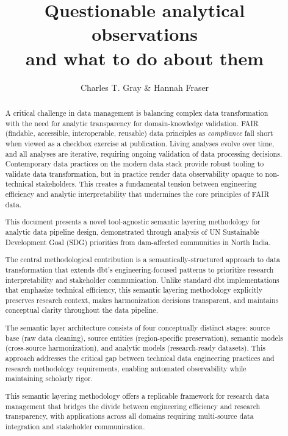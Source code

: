 \documentclass{article}
\title{Questionable analytical observations\\and what to do about them}
\author{Charles T. Gray \& Hannah Fraser}
\begin{document}
\maketitle



\begin{abstract}

A critical challenge in data management is balancing complex data transformation with the need for analytic transparency for domain-knowledge validation. FAIR (findable, accessible, interoperable, reusable) data principles as \textit{compliance} fall short when viewed as a checkbox exercise at publication. Living analyses evolve over time, and all analyses are iterative, requiring ongoing validation of data processing decisions. Contemporary data practices on the modern data stack provide robust tooling to validate data transformation, but in practice render data observability opaque to non-technical stakeholders. This creates a fundamental tension between engineering efficiency and analytic interpretability that undermines the core principles of FAIR data.

This document presents a novel tool-agnostic semantic layering methodology for analytic data pipeline design, demonstrated through analysis of UN Sustainable Development Goal (SDG) priorities from dam-affected communities in North India.

The central methodological contribution is a semantically-structured approach to data transformation that extends dbt's engineering-focused patterns to prioritize research interpretability and stakeholder communication. Unlike standard dbt implementations that emphasize technical efficiency, this semantic layering methodology explicitly preserves research context, makes harmonization decisions transparent, and maintains conceptual clarity throughout the data pipeline.

The semantic layer architecture consists of four conceptually distinct stages: source base (raw data cleaning), source entities (region-specific preservation), semantic models (cross-source harmonization), and analytic models (research-ready datasets). This approach addresses the critical gap between technical data engineering practices and research methodology requirements, enabling automated observability while maintaining scholarly rigor.

This semantic layering methodology offers a replicable framework for research data management that bridges the divide between engineering efficiency and research transparency, with applications across all domains requiring multi-source data integration and stakeholder communication.

\end{abstract}
\end{document}
